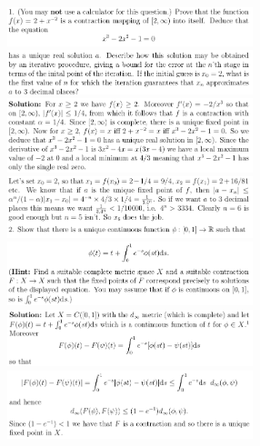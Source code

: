 \documentclass[8pt,landscape]{article}
\begin{document}
\begin{multicols}{3}
    \includegraphics[width=270]{106.png} \\
    \includegraphics[width=270]{107.png} \\
    \includegraphics[width=270]{108.png} \\
    \includegraphics[width=270]{109.png} \\
    \includegraphics[width=270]{110.png} \\
    \includegraphics[width=270]{111.png} \\
    \includegraphics[width=270]{112.png} \\

\end{multicols}
\end{document}
